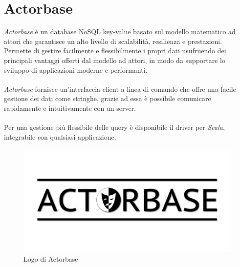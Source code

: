 \documentclass[a4paper]{article}
\begin{document}
	\section{Actorbase}
	\emph{Actorbase} è un database NoSQL key-value basato sul modello matematico ad attori che garantisce un alto livello di scalabilità, resilienza e prestazioni. Permette di gestire facilmente e flessibilmente i propri dati usufruendo dei principali vantaggi offerti dal modello ad attori, in modo
	da supportare lo sviluppo di applicazioni moderne e performanti. 
	\\ \\
	\emph{Actorbase} fornisce un'interfaccia client a linea di comando che offre una facile gestione dei dati come stringhe, grazie ad essa è possibile comunicare rapidamente e intuitivamente con un server. 
	\\ \\
	Per una gestione più flessibile delle query è disponibile il driver per \emph{Scala}, integrabile con qualsiasi applicazione.
	\begin{figure}[H]
		\centering
		\includegraphics[scale=0.4]{actorbaseLogo.png}
		\caption{Logo di Actorbase}
	\end{figure}

	\newpage
\end{document}
